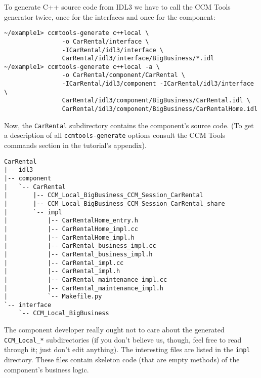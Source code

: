 \newpage
To generate C++ source code from IDL3 we have to call the CCM Tools generator
twice, once for the interfaces and once for the component:
\begin{small}
\begin{verbatim}
~/example1> ccmtools-generate c++local \
                -o CarRental/interface \
                -ICarRental/idl3/interface \
                CarRental/idl3/interface/BigBusiness/*.idl
~/example1> ccmtools-generate c++local -a \
                -o CarRental/component/CarRental \
                -ICarRental/idl3/component -ICarRental/idl3/interface \
                CarRental/idl3/component/BigBusiness/CarRental.idl \
                CarRental/idl3/component/BigBusiness/CarRentalHome.idl
\end{verbatim}
\end{small}

Now, the {\tt CarRental} subdirectory contains the component's source code. 
(To get a description of all {\tt ccmtools-generate} options consult the 
CCM Tools commands section in the tutorial's appendix).
\begin{small}
\begin{verbatim}
CarRental
|-- idl3
|-- component
|   `-- CarRental
|       |-- CCM_Local_BigBusiness_CCM_Session_CarRental
|       |-- CCM_Local_BigBusiness_CCM_Session_CarRental_share
|       `-- impl
|           |-- CarRentalHome_entry.h
|           |-- CarRentalHome_impl.cc
|           |-- CarRentalHome_impl.h
|           |-- CarRental_business_impl.cc
|           |-- CarRental_business_impl.h
|           |-- CarRental_impl.cc
|           |-- CarRental_impl.h
|           |-- CarRental_maintenance_impl.cc
|           |-- CarRental_maintenance_impl.h
|           `-- Makefile.py
`-- interface
    `-- CCM_Local_BigBusiness
\end{verbatim}
\end{small}

The component developer really ought not to care about the generated 
{\tt CCM\_Local\_*} subdirectories (if you don't believe us, though, feel free 
to read through it; just don't edit anything). 
The interesting files are listed in the {\tt impl} directory. 
These files contain skeleton code (that are empty methods) of the component's 
business logic.

